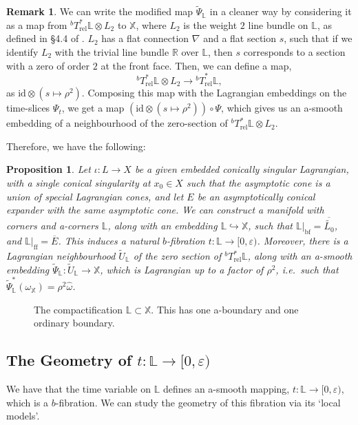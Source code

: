 \documentclass[10pt, a4paper]{article}
\theoremstyle{plain}%
\newtheorem{prop}[theorem]{Proposition}
\theoremstyle{definition}
\newtheorem{rem}[theorem]{Remark}
\numberwithin{figure}{section}
\numberwithin{equation}{section}
\newcommand{\bL}{\mathbb{L}}
\newcommand{\bX}{\mathbb{X}}
\newcommand{\bR}{\mathbb{R}}
\newcommand{\rt}{\rightarrow}
\newcommand{\ep}{\varepsilon}
\newcommand{\tpsil}{\tilde{\Psi}_\bL}
\newcommand{\rel}{\mathrm{rel}}
\newcommand{\ff}{\mathrm{ff}}
\newcommand{\botf}{\textrm{bf}}
\begin{document}
\begin{rem}
	We can write the modified map $\tilde{\Psi}_\bL$ in a cleaner way by considering it as a map from $^bT^*_\mathrm{rel}\bL\otimes L_2 $ to $\bX$, where $L_2$ is the weight $2$ line bundle on $\bL$, as defined in \S 4.4 of \cite{Joy16}. $L_2$ has a flat connection $\nabla$ and a flat section $s$, such that if we identify $L_2$ with the trivial line bundle $\bR$ over $\bL$, then $s$ corresponds to a section with a zero of order $2$ at the front face. Then, we can define a map,\[
	^bT^*_\mathrm{rel}\bL \otimes L_2\rt {^bT}^*_\mathrm{rel}\bL,
	\]
	as $\mathrm{id}\otimes (s\mapsto \rho^2)$.  Composing this map with the Lagrangian embeddings on the time-slices $\Psi_t$, we get a map $(\mathrm{id}\otimes (s\mapsto \rho^2))\circ \Psi$, which gives us an a-smooth embedding of a neighbourhood of the zero-section of $^bT^*_\mathrm{rel}\bL\otimes L_2$.
\end{rem}

Therefore, we have the following:
\begin{prop}\label{prop_constructionacorners}
	Let $\iota: L \rt X$ be a given embedded conically singular Lagrangian, with a single conical singularity at $x_0\in X$ such that the asymptotic cone is a union of special Lagrangian cones, and let $E$ be an asymptotically conical expander with the same asymptotic cone. We can construct a manifold with corners and a-corners $\bL$, along with an embedding $\bL \hookrightarrow \bX$, such that $\bL|_{\botf} = \overline{\widetilde{L_0}}$, and $\bL|_{\ff} = \overline{E}$. This induces a natural $b$-fibration $t:\bL\rt[0,\ep)$. Moreover, there is a Lagrangian neighbourhood $\widetilde{U}_\bL$ of the zero section of $^bT^*_\rel \bL$, along with an a-smooth embedding $\tpsil: \widetilde{U}_{\bL} \rt \bX$, which is Lagrangian up to a factor of $\rho^2$, i.e.\ such that $\tpsil^*(\omega_\bX) = \rho^{2}\hat{\omega}$. 
\end{prop}
\begin{figure}[!htb]
	\centering
	\fontsize{9}{9}\selectfont{}
	
	\caption{The compactification $\bL \subset \bX$. This has one a-boundary and one ordinary boundary.}

\end{figure}


\subsection{The Geometry of $t:\bL \rt [0,\ep)$}
We have that the time variable on $\bL$ defines an a-smooth mapping, $t: \bL\rt [0,\ep)$, which is a $b$-fibration. We can study the geometry of this fibration via its `local models'.
\end{document}
